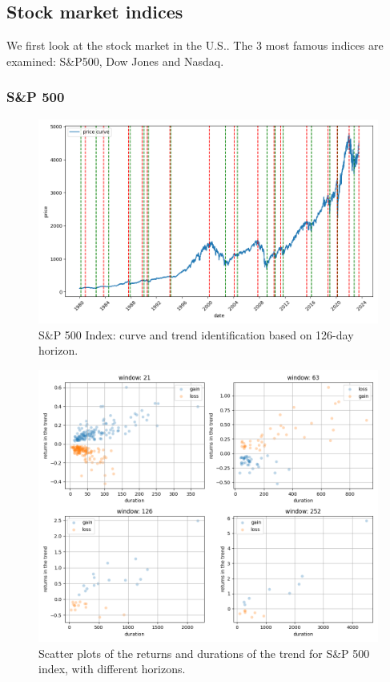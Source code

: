\subsection{Stock market indices}

We first look at the stock market in the U.S.. The 3 most famous indices are examined: S\&P500, Dow Jones and Nasdaq. 

\subsubsection{S\&P 500}

\begin{figure}[h]
	\centering
	\includegraphics[width=0.8\linewidth]{chapters/chapter1/figures/curve_GSPC_126D}
	\caption{S\&P 500 Index: curve and trend identification based on 126-day horizon.}
	\label{fig:curvegspc126d}
\end{figure}

\begin{figure}[h]
	\centering
	\includegraphics[width=1\linewidth]{chapters/chapter1/figures/scatter_GSPC}
	\caption{Scatter plots of the returns and durations of the trend for S\&P 500 index, with different horizons.}
	\label{fig:scattergspc}
\end{figure}

